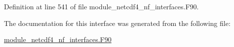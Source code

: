 Definition at line 541 of file module\+\_\+netcdf4\+\_\+nf\+\_\+interfaces.\+F90.



The documentation for this interface was generated from the following file\+:\begin{DoxyCompactItemize}
\item 
\hyperlink{module__netcdf4__nf__interfaces_8F90}{module\+\_\+netcdf4\+\_\+nf\+\_\+interfaces.\+F90}\end{DoxyCompactItemize}
